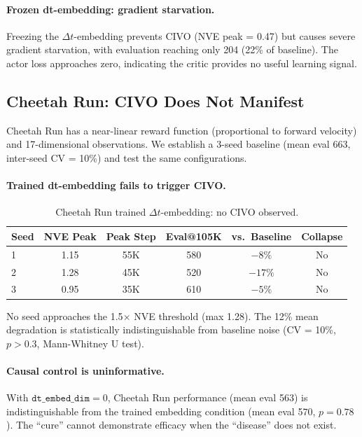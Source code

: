 \documentclass[letterpaper]{article}
\begin{document}
\paragraph{Frozen dt-embedding: gradient starvation.}

Freezing the $\Delta t$-embedding prevents CIVO (NVE peak = 0.47) but causes severe gradient starvation, with evaluation reaching only 204 (22\% of baseline). The actor loss approaches zero, indicating the critic provides no useful learning signal.

\subsection{Cheetah Run: CIVO Does Not Manifest}

Cheetah Run has a near-linear reward function (proportional to forward velocity) and 17-dimensional observations. We establish a 3-seed baseline (mean eval 663, inter-seed CV = 10\%) and test the same configurations.

\paragraph{Trained dt-embedding fails to trigger CIVO.}

\begin{table}[h]
\centering
\caption{Cheetah Run trained $\Delta t$-embedding: no CIVO observed.}
\label{tab:cheetah_trained}
\begin{tabular}{lccccc}
\toprule
Seed & NVE Peak & Peak Step & Eval@105K & vs.\ Baseline & Collapse \\
\midrule
1 & 1.15 & 55K & 580 & $-8\%$ & No \\
2 & 1.28 & 45K & 520 & $-17\%$ & No \\
3 & 0.95 & 35K & 610 & $-5\%$ & No \\
\bottomrule
\end{tabular}
\end{table}

No seed approaches the 1.5$\times$ NVE threshold (max 1.28). The 12\% mean degradation is statistically indistinguishable from baseline noise (CV = 10\%, $p > 0.3$, Mann-Whitney U test).

\paragraph{Causal control is uninformative.}

With $\texttt{dt\_embed\_dim}=0$, Cheetah Run performance (mean eval 563) is indistinguishable from the trained embedding condition (mean eval 570, $p = 0.78$). The ``cure'' cannot demonstrate efficacy when the ``disease'' does not exist.
\end{document}
